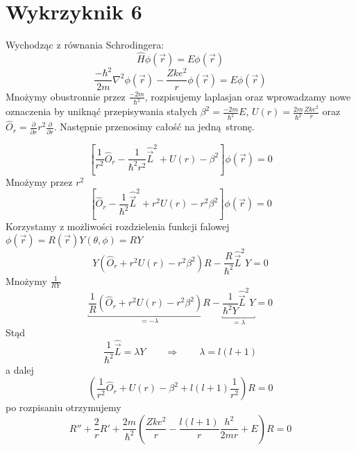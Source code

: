 \documentclass[a4paper,12pt]{article}
\begin{document}
\section{Wykrzyknik 6}
Wychodząc z równania Schrodingera:
\[
  \hat{H} \phi(\vec{r})  = E \phi (\vec{r})
\]
\[
  \frac{-\hbar^2}{2m}\nabla^2 \phi (\vec{r}) - \frac{Zke^2}{r}\phi (\vec{r}) = E
\phi (\vec{r})
\]
Mnożymy obustronnie przez $\frac{-2m}{\hbar^2}$, rozpisujemy laplasjan oraz
wprowadzamy nowe oznaczenia by uniknąć przepisywania stałych $\beta^2 =
\frac{-2m}{\hbar^2}E$, $U(r) = \frac{2m}{\hbar^2}\frac{Zke^2}{r}$ oraz
$\hat{O}_r = \frac{\partial}{\partial r}r^2 \frac{\partial}{\partial r}$.
Następnie przenosimy całość na jedną stronę.

\[
  \left[ \frac{1}{r^2} \hat{O}_r - \frac{1}{\hbar^2 r^2}\hat{\vec{L}}^2 + U(r) -
\beta^2 \right] \phi (\vec{r}) = 0
\]
Mnożymy przez $r^2$
\[
  \left[ \hat{O}_r - \frac{1}{\hbar^2}\hat{\vec{L}}^2 + r^2U(r) -
r^2 \beta^2 \right] \phi (\vec{r}) = 0
\]
Korzystamy z możliwości rozdzielenia funkcji falowej $\phi (\vec{r}) =
R(\vec{r}) Y(\theta, \phi) = R Y$
\[
  Y\left( \hat{O}_r + r^2U(r) -
  r^2 \beta^2 \right)R - \frac{R}{\hbar^2}\hat{\vec{L}}^2Y = 0
\]
Mnożymy $\frac{1}{RY}$
\[
  \underbracket{\frac{1}{R}\left( \hat{O}_r + r^2U(r) -
    r^2 \beta^2 \right)R}_{=-\lambda} - \underbracket{\frac{1}{\hbar^2
Y}\hat{\vec{L}}^2Y}_{=\lambda} = 0
\]
Stąd 
\[
  \frac{1}{\hbar^2}\hat{\vec{L}} = \lambda Y \qquad \Rightarrow \qquad \lambda = l(l+1)
\]
a dalej
\[
  \left(\frac{1}{r^2}\hat{O}_r + U(r) - \beta^2 + l(l+1)\frac{1}{r^2} \right)R = 0
\]
po rozpisaniu otrzymujemy
\[
  R'' + \frac{2}{r}R' + \frac{2m}{\hbar^2}\left(\frac{Zke^2}{r} -
  \frac{l(l+1)}{r} \frac{h^2}{2mr} + E \right) R = 0
\]
\end{document}
